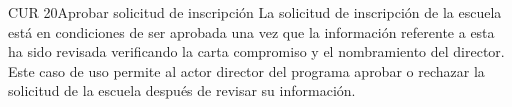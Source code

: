 \begin{UseCase}{CUR 20}{Aprobar solicitud de inscripción}
    {
	La solicitud de inscripción de la escuela está en condiciones de ser aprobada una vez que la información referente a esta ha sido revisada verificando la carta compromiso y el nombramiento del director. Este caso de uso permite al actor director del programa aprobar o rechazar la solicitud de la escuela después de revisar su información.
    }



\end{UseCase}

